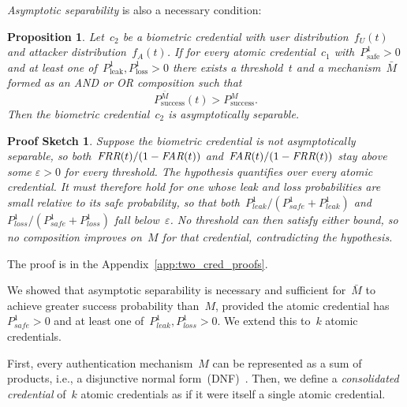 \documentclass[conference,compsoc]{IEEEtran}
\newtheorem{proposition}{Proposition}
\newtheorem*{proofsketch}{Proof Sketch}
\begin{document}
\emph{Asymptotic separability} is also a necessary condition:
\begin{proposition}\label{thm:nec_cond_for_improve}
    Let~$c_2$ be a biometric credential with user distribution~$f_U(t)$ and attacker distribution~$f_A(t)$. If for every atomic credential~$c_1$ with~$P^1_\text{safe} > 0$ and at least one of~$P^1_\text{leak},P^1_\text{loss} > 0$ there exists a threshold~$t$ and a mechanism~$\bar{M}$ formed as an \emph{AND} or \emph{OR} composition such that
    \begin{equation*}
    P^{\bar{M}}_{\text{success}}(t) > P^{M}_{\text{success}}.
    \end{equation*}
    Then the biometric credential~$c_2$ is asymptotically separable.
\end{proposition} 
\noindent
\begin{proofsketch}
Suppose the biometric credential is not asymptotically separable, so both~$\textit{FRR}(t)/(1-\textit{FAR}(t))$ and~$\textit{FAR}(t)/(1-\textit{FRR}(t))$ stay above some $\varepsilon > 0$ for every threshold.
The hypothesis quantifies over \emph{every} atomic credential. It must therefore hold for one whose leak and loss probabilities are small relative to its safe probability, so that both~$P^1_{leak}/(P^1_{safe}+P^1_{leak})$ and~$P^1_{loss}/(P^1_{safe}+P^1_{loss})$ fall below~$\varepsilon$.
No threshold can then satisfy either bound, so no composition improves on~$M$ for that credential, contradicting the hypothesis.
\end{proofsketch}
\noindent
The proof is in the Appendix~\ref{app:two_cred_proofs}.

We showed that asymptotic separability is necessary and sufficient for~$\bar{M}$ to achieve greater success probability than~$M$, provided the atomic credential has~$P^1_{safe} > 0$ and at least one of~$P^1_{leak}, P^1_{loss} > 0$.
We extend this to~$k$ atomic credentials.

First, every authentication mechanism~$M$ can be represented as a sum of products, i.e., a disjunctive normal form~(DNF)~\cite{Mendelson1997}. Then, we define a \emph{consolidated credential} of~$k$ atomic credentials as if it were itself a single atomic credential.
\end{document}

